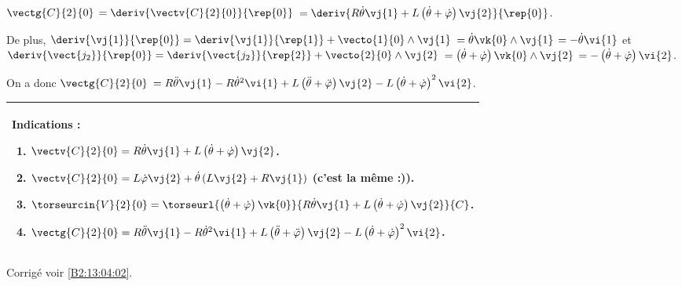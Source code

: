 $\vectg{C}{2}{0}$ $ = \deriv{\vectv{C}{2}{0}}{\rep{0}}$ $= \deriv{R\dot{\theta}\vj{1}+L\left( \dot{\theta}+\dot{\varphi}\right)\vj{2}}{\rep{0}}$.

De plus,  $\deriv{\vj{1}}{\rep{0}} = \deriv{\vj{1}}{\rep{1}} + \vecto{1}{0}\wedge \vj{1}$
$ =\dot{\theta}\vk{0} \wedge \vj{1} $ $=-\dot{\theta}\vi{1}$ et 
$\deriv{\vect{j_2}}{\rep{0}} = \deriv{\vect{j_2}}{\rep{2}} + \vecto{2}{0}\wedge \vj{2}$
$ = \left( \dot{\theta}+\dot{\varphi}\right)\vk{0}\wedge \vj{2}$ $ = -\left( \dot{\theta}+\dot{\varphi}\right)\vi{2}$.

On a donc $\vectg{C}{2}{0}$ $=R\ddot{\theta}\vj{1}-R\dot{\theta}^2\vi{1}+L\left( \ddot{\theta}+\ddot{\varphi}\right)\vj{2}-L\left( \dot{\theta}+\dot{\varphi}\right)^2\vi{2}$.

\else
\fi

\ifprof
\else
\footnotesize
\begin{center}
\begin{tabular}{|p{.9\linewidth}|}
\hline
Indications :
\begin{enumerate}
\item $ \vectv{C}{2}{0}= R\dot{\theta}\vj{1}+L\left( \dot{\theta}+\dot{\varphi}\right)\vj{2}$.
\item $\vectv{C}{2}{0} = L\dot{\varphi}\vj{2} + \dot{\theta}\left( L\vj{2} +R\vj{1}\right)$ (c'est la même :)).
\item $\torseurcin{V}{2}{0}=\torseurl{ \left( \dot{\theta}+\dot{\varphi}\right)\vk{0}}{R\dot{\theta}\vj{1}+L\left( \dot{\theta}+\dot{\varphi}\right)\vj{2}}{C}$.
\item $\vectg{C}{2}{0}=R\ddot{\theta}\vj{1}-R\dot{\theta}^2\vi{1}+L\left( \ddot{\theta}+\ddot{\varphi}\right)\vj{2}-L\left( \dot{\theta}+\dot{\varphi}\right)^2\vi{2}$.
\end{enumerate} \\ \hline
\end{tabular}
\end{center}
\normalsize
\begin{flushright}
\footnotesize{Corrigé  voir \ref{B2:13:04:02}.}
\end{flushright}%
\fi